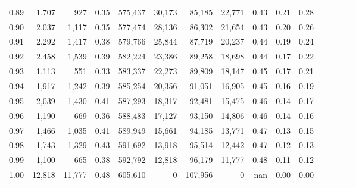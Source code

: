 \begin{tabular}{rrrcrrrrrrrrrrr}
0.89 &   1,707 &     927 &                                       0.35 &  575,437 &   30,173 &   85,185 &   22,771 &  0.43 &  0.21 &                         0.28 \\
0.90 &   2,037 &   1,117 &                                       0.35 &  577,474 &   28,136 &   86,302 &   21,654 &  0.43 &  0.20 &                         0.26 \\
0.91 &   2,292 &   1,417 &                                       0.38 &  579,766 &   25,844 &   87,719 &   20,237 &  0.44 &  0.19 &                         0.24 \\
0.92 &   2,458 &   1,539 &                                       0.39 &  582,224 &   23,386 &   89,258 &   18,698 &  0.44 &  0.17 &                         0.22 \\
0.93 &   1,113 &     551 &                                       0.33 &  583,337 &   22,273 &   89,809 &   18,147 &  0.45 &  0.17 &                         0.21 \\
0.94 &   1,917 &   1,242 &                                       0.39 &  585,254 &   20,356 &   91,051 &   16,905 &  0.45 &  0.16 &                         0.19 \\
0.95 &   2,039 &   1,430 &                                       0.41 &  587,293 &   18,317 &   92,481 &   15,475 &  0.46 &  0.14 &                         0.17 \\
0.96 &   1,190 &     669 &                                       0.36 &  588,483 &   17,127 &   93,150 &   14,806 &  0.46 &  0.14 &                         0.16 \\
0.97 &   1,466 &   1,035 &                                       0.41 &  589,949 &   15,661 &   94,185 &   13,771 &  0.47 &  0.13 &                         0.15 \\
0.98 &   1,743 &   1,329 &                                       0.43 &  591,692 &   13,918 &   95,514 &   12,442 &  0.47 &  0.12 &                         0.13 \\
0.99 &   1,100 &     665 &                                       0.38 &  592,792 &   12,818 &   96,179 &   11,777 &  0.48 &  0.11 &                         0.12 \\
1.00 &  12,818 &  11,777 &                                       0.48 &  605,610 &        0 &  107,956 &        0 &   nan &  0.00 &                         0.00 \\
\bottomrule
\end{tabular}
